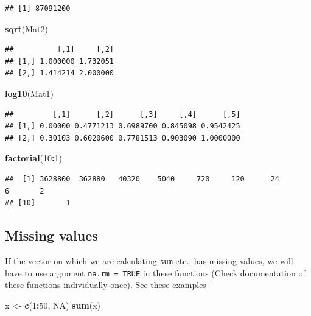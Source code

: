 \documentclass[
]{book}
\newenvironment{Shaded}{\begin{snugshade}}{\end{snugshade}}
\newcommand{\ConstantTok}[1]{\textcolor[rgb]{0.56,0.35,0.01}{#1}}
\newcommand{\DecValTok}[1]{\textcolor[rgb]{0.00,0.00,0.81}{#1}}
\newcommand{\FunctionTok}[1]{\textcolor[rgb]{0.13,0.29,0.53}{\textbf{#1}}}
\newcommand{\NormalTok}[1]{#1}
\newcommand{\OtherTok}[1]{\textcolor[rgb]{0.56,0.35,0.01}{#1}}
\newcommand{\SpecialCharTok}[1]{\textcolor[rgb]{0.81,0.36,0.00}{\textbf{#1}}}
\begin{document}
\begin{verbatim}
## [1] 87091200
\end{verbatim}

\begin{Shaded}
\begin{Highlighting}[]
\FunctionTok{sqrt}\NormalTok{(Mat2)}
\end{Highlighting}
\end{Shaded}

\begin{verbatim}
##          [,1]     [,2]
## [1,] 1.000000 1.732051
## [2,] 1.414214 2.000000
\end{verbatim}

\begin{Shaded}
\begin{Highlighting}[]
\FunctionTok{log10}\NormalTok{(Mat1)}
\end{Highlighting}
\end{Shaded}

\begin{verbatim}
##         [,1]      [,2]      [,3]     [,4]      [,5]
## [1,] 0.00000 0.4771213 0.6989700 0.845098 0.9542425
## [2,] 0.30103 0.6020600 0.7781513 0.903090 1.0000000
\end{verbatim}

\begin{Shaded}
\begin{Highlighting}[]
\FunctionTok{factorial}\NormalTok{(}\DecValTok{10}\SpecialCharTok{:}\DecValTok{1}\NormalTok{)}
\end{Highlighting}
\end{Shaded}

\begin{verbatim}
##  [1] 3628800  362880   40320    5040     720     120      24       6       2
## [10]       1
\end{verbatim}

\hypertarget{missing-values}{%
\subsection*{Missing values}\label{missing-values}}

If the vector on which we are calculating \texttt{sum} etc., has missing values, we will have to use argument \texttt{na.rm\ =\ TRUE} in these functions (Check documentation of these functions individually once). See these examples -

\begin{Shaded}
\begin{Highlighting}[]
\NormalTok{x }\OtherTok{\textless{}{-}} \FunctionTok{c}\NormalTok{(}\DecValTok{1}\SpecialCharTok{:}\DecValTok{50}\NormalTok{, }\ConstantTok{NA}\NormalTok{)}
\FunctionTok{sum}\NormalTok{(x)}
\end{Highlighting}
\end{Shaded}
\end{document}
